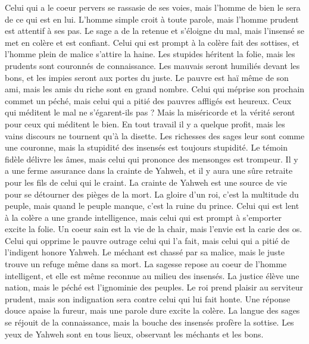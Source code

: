 \begin{multicols}{2}
Celui qui a le coeur pervers se rassasie de ses voies, mais l'homme de bien le sera de ce qui est en lui.
L’homme simple croit à toute parole, mais l'homme prudent est attentif à ses pas.
Le sage a de la retenue et s’éloigne du mal, mais l’insensé se met en colère et est confiant.
Celui qui est prompt à la colère fait des sottises, et l'homme plein de malice s’attire la haine.
Les stupides héritent la folie, mais les prudents sont couronnés de connaissance.
Les mauvais seront humiliés devant les bons, et les impies seront aux portes du juste.
Le pauvre est haï même de son ami, mais les amis du riche sont en grand nombre.
Celui qui méprise son prochain commet un péché, mais celui qui a pitié des pauvres affligés est heureux.
Ceux qui méditent le mal ne s’égarent-ils pas ? Mais la miséricorde et la vérité seront pour ceux qui méditent le bien.
En tout travail il y a quelque profit, mais les vains discours ne tournent qu'à la disette.
Les richesses des sages leur sont comme une couronne, mais la stupidité des insensés est toujours stupidité.
Le témoin fidèle délivre les âmes, mais celui qui prononce des mensonges est trompeur.
Il y a une ferme assurance dans la crainte de Yahweh, et il y aura une sûre retraite pour les fils de celui qui le craint.
La crainte de Yahweh est une source de vie pour se détourner des pièges de la mort.
La gloire d'un roi, c'est la multitude du peuple, mais quand le peuple manque, c'est la ruine du prince.
Celui qui est lent à la colère a une grande intelligence, mais celui qui est prompt à s’emporter excite la folie.
Un coeur sain est la vie de la chair, mais l'envie est la carie des os.
Celui qui opprime le pauvre outrage celui qui l'a fait, mais celui qui a pitié de l’indigent honore Yahweh.
Le méchant est chassé par sa malice, mais le juste trouve un refuge même dans sa mort.
La sagesse repose au coeur de l'homme intelligent, et elle est même reconnue au milieu des insensés.
La justice élève une nation, mais le péché est l'ignominie des peuples.
Le roi prend plaisir au serviteur prudent, mais son indignation sera contre celui qui lui fait honte.
\VerseOne{}Une réponse douce apaise la fureur, mais une parole dure excite la colère.
La langue des sages se réjouit de la connaissance, mais la bouche des insensés profère la sottise.
Les yeux de Yahweh sont en tous lieux, observant les méchants et les bons.

\end{multicols}
